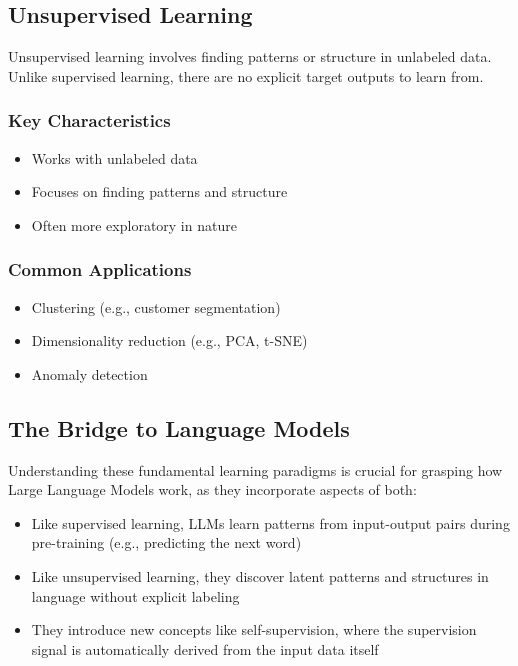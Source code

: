 \subsection{Unsupervised Learning}

Unsupervised learning involves finding patterns or structure in unlabeled data. Unlike supervised learning, there are no explicit target outputs to learn from.

\subsubsection{Key Characteristics}
\begin{itemize}[noitemsep]
    \item Works with unlabeled data
    \item Focuses on finding patterns and structure
    \item Often more exploratory in nature
\end{itemize}

\subsubsection{Common Applications}
\begin{itemize}[noitemsep]
    \item Clustering (e.g., customer segmentation)
    \item Dimensionality reduction (e.g., PCA, t-SNE)
    \item Anomaly detection
\end{itemize}

\subsection{The Bridge to Language Models}

Understanding these fundamental learning paradigms is crucial for grasping how Large Language Models work, as they incorporate aspects of both:

\begin{itemize}[noitemsep]
    \item Like supervised learning, LLMs learn patterns from input-output pairs during pre-training (e.g., predicting the next word)
    \item Like unsupervised learning, they discover latent patterns and structures in language without explicit labeling
    \item They introduce new concepts like self-supervision, where the supervision signal is automatically derived from the input data itself
\end{itemize}

